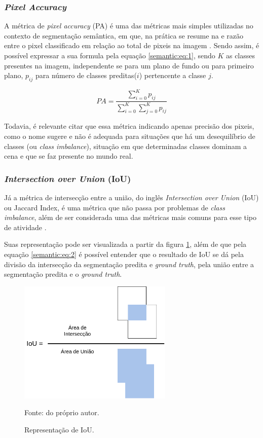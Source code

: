 \subsubsection{\textit{Pixel Accuracy}}
\label{semantic:pa}

A métrica de \textit{pixel accuracy} (PA) é uma das métricas mais simples utilizadas no contexto de segmentação semântica, em que, na prática se resume na e razão entre o pixel classificado em relação ao total de pixeis na imagem \cite{Minaee2021}. Sendo assim, é possível expressar a sua formula pela equação \ref{semantic:eq:1}, sendo $K$ as classes presentes na imagem, independente se para um plano de fundo ou para primeiro plano, $p_{ij}$ para número de classes preditas($i$) pertencente a classe $j$.

\begin{equation}
    \label{semantic:eq:1}
    PA = \frac{\sum_{i=0}^{K} p_{ij}}{\sum_{i=0}^{K} \sum_{j=0}^{K} p_{ij}}
\end{equation}

Todavia, é relevante citar que essa métrica indicando apenas precisão dos pixeis, como o nome sugere e não é adequada para situações que há um desequilíbrio de classes (ou \textit{class imbalance}), situação em que determinadas classes dominam a cena e que se faz presente no mundo real.


\subsubsection{\textit{Intersection over Union} (IoU)}
\label{semantic:IoU}

Já a métrica de intersecção entre a união, do inglês \textit{Intersection over Union} (IoU) ou Jaccard Index, é uma métrica que não passa por problemas de \textit{class imbalance}, além de ser considerada uma das métricas mais comuns para esse tipo de atividade \cite{Minaee2021}.

Suas representação pode ser visualizada a partir da figura \ref{semantic:fig:1}, além de que pela equação \ref{semantic:eq:2} é possível entender que o resultado de IoU se dá pela divisão da intersecção da segmentação predita e \textit{ground truth}, pela união entre a segmentação predita e o \textit{ground truth}.

\begin{figure}[H]
    \centering
    \caption{Representação de IoU.}
    \includegraphics[height=2.3in]{recursos/imagens/semantic/IoU.png}
    \label{semantic:fig:1}

    \vspace*{1 cm}
    Fonte: do próprio autor.
\end{figure}

